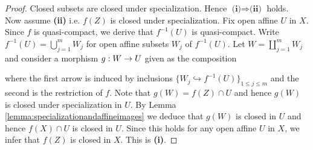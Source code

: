 \begin{proof}
Closed subsets are closed under specialization. Hence $\textbf{(i)}\Rightarrow \textbf{(ii)}$ holds.\\
Now assume \textbf{(ii)} i.e. $f(Z)$ is closed under specialization. Fix open affine $U$ in $X$. Since $f$ is quasi-compact, we derive that $f^{-1}(U)$ is quasi-compact. Write $f^{-1}(U) = \bigcup_{j=1}^mW_j$ for open affine subsets $W_j$ of $f^{-1}(U)$. Let $W = \coprod_{j=1}^mW_j$ and consider a morphism $g:W\rightarrow U$ given as the composition
\begin{center}
\end{center}
where the first arrow is induced by inclusions $\big\{W_j\hookrightarrow f^{-1}(U)\big\}_{1\leq j\leq m}$ and the second is the restriction of $f$. Note that $g(W) = f(Z)\cap U$ and hence $g(W)$ is closed under specialization in $U$. By Lemma \ref{lemma:specializationandaffineimages} we deduce that $g(W)$ is closed in $U$ and hence $f(X)\cap U$ is closed in $U$. Since this holds for any open affine $U$ in $X$, we infer that $f(Z)$ is closed in $X$. This is \textbf{(i)}.
\end{proof}












































